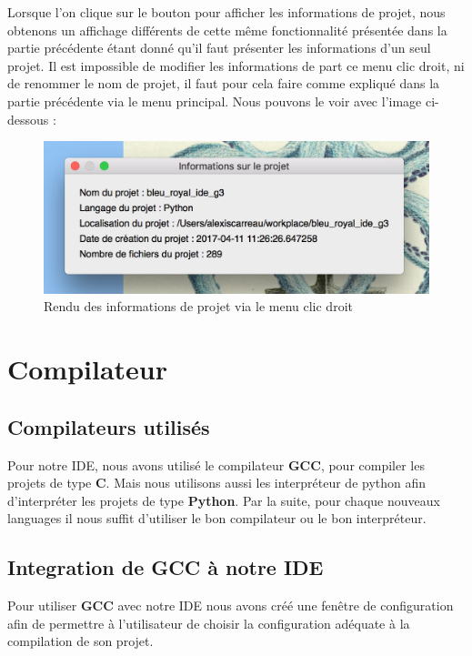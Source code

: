 \documentclass[a4paper,12pt]{article}
\begin{document}
		
Lorsque l'on clique sur le bouton pour afficher les informations de projet, nous obtenons un affichage différents de cette même fonctionnalité présentée dans la partie précédente étant donné qu'il faut présenter les informations d'un seul projet. Il est impossible de modifier les informations de part ce menu clic droit, ni de renommer le nom de projet, il faut pour cela faire comme expliqué dans la partie précédente via le menu principal. Nous pouvons le voir avec l'image ci-dessous :

 \begin{figure}[h!]
			\begin{center}
				\includegraphics[scale=0.5]{images/imgs_projet/info_project4.png}
				\caption{Rendu des informations de projet via le menu clic droit}
			\end{center}
		\end{figure}


\section{Compilateur}

	\subsection{Compilateurs utilisés}

		Pour notre IDE, nous avons utilisé le compilateur \textbf{GCC}, pour compiler les projets de type \textbf{C}. Mais nous utilisons aussi les interpréteur de python afin d'interpréter les projets de type \textbf{Python}. Par la suite, pour chaque nouveaux languages il nous suffit d'utiliser le bon compilateur ou le bon interpréteur.
		
	\subsection{Integration de \textbf{GCC} à notre IDE}

		Pour utiliser \textbf{GCC} avec notre IDE nous avons créé une fenêtre de configuration afin de permettre à l'utilisateur de choisir la configuration adéquate à la compilation de son projet.
\end{document}
